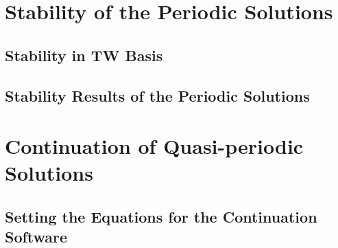 
\section{Stability of the Periodic Solutions}

\subsection{Stability in TW Basis}

\subsection{Stability Results of the Periodic Solutions}

\section{Continuation of Quasi-periodic Solutions}

\subsection{Setting the Equations for the Continuation Software}



